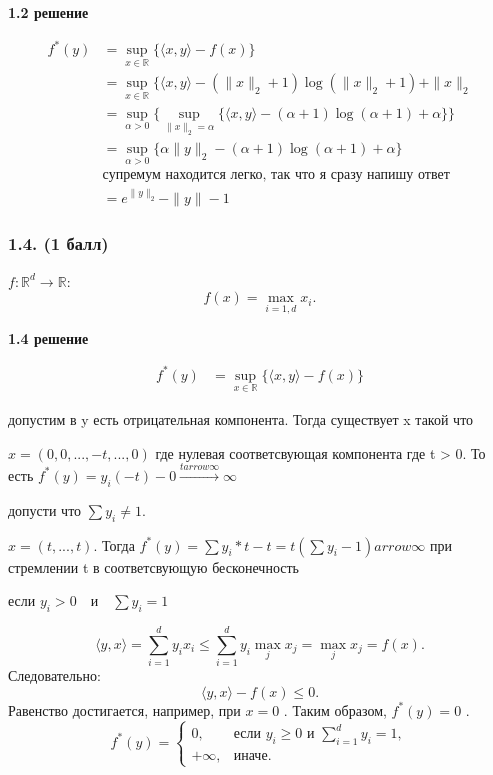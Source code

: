 \documentclass[12pt]{article}
\begin{document}
\textbf{1.2 решение}

$$
\begin{aligned}
    f^*(y)
    &= \sup_{x \in \mathbb{R}} \{ \langle x, y\rangle - f(x) \} \\
    &= \sup_{x \in \mathbb{R}} \{ \langle x, y\rangle - (\|x\|_2 + 1) \log(\|x\|_2 + 1) + \|x\|_2 \\
    &= \sup_{\alpha > 0} \{\sup_{\|x\|_2  =\alpha}\{\langle x, y\rangle - (\alpha + 1) \log(\alpha + 1) + \alpha\}\}  \\
    &= \sup_{\alpha > 0} \{\alpha \|y\|_2- (\alpha + 1) \log(\alpha + 1) + \alpha\} \\
    & \text{супремум находится легко, так что я сразу напишу ответ} \\
    &= e^{\|y\|_2} - \|y\| - 1
\end{aligned}
$$
\subsubsection*{1.4. (1 балл)}
$ f : \mathbb{R}^d \to \mathbb{R} $: 
$$
f(x) = \max_{i=1,d} x_i.
$$

\textbf{1.4 решение}

$$
\begin{aligned}
    f^*(y)
    &= \sup_{x \in \mathbb{R}} \{ \langle x, y\rangle - f(x) \}
\end{aligned}
$$

допустим в y есть отрицательная компонента. Тогда существует x такой что

$x = (0, 0, ..., -t, ..., 0)$  где нулевая соответсвующая компонента где t > 0. То есть $f^*(y) = y_i(-t) - 0 \xrightarrow{t  arrow \infty} \infty$

допусти что $\sum y_i\ne 1$. 

$x = (t, ..., t)$. Тогда $f^*(y) = \sum y_i * t -t = t (\sum y_i - 1)  arrow \infty $
при стремлении t в соответсвующую бесконечность

если $y_i > 0 \quad \text{и} \quad \sum y_i = 1 $

$$
\langle y, x \rangle = \sum_{i=1}^d y_i x_i \leq \sum_{i=1}^d y_i \max_j x_j = \max_j x_j = f(x).
$$
Следовательно:
$$
\langle y, x \rangle - f(x) \leq 0.
$$
Равенство достигается, например, при  $x = 0$ . Таким образом, $ f^*(y) = 0$ .
$$
f^*(y) = 
\begin{cases} 
0, & \text{если } y_i \geq 0 \text{ и } \sum_{i=1}^d y_i = 1, \\
+\infty, & \text{иначе}.
\end{cases}
$$
\end{document}
